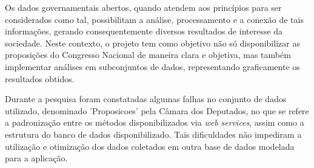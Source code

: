 \documentclass[
	12pt,				%
	openright,			%
	twoside,			%
	a4paper,			%
	english,			%
	french,				%
	spanish,			%
	brazil				%
	]{abntex2}
\begin{document}
Os dados governamentais abertos, quando atendem aos princípios para ser considerados como tal, possibilitam a análise, 
processamento e a conexão de tais informações, gerando consequentemente diversos resultados de interesse da sociedade. 
Neste contexto, o projeto tem como objetivo não só disponibilizar as proposições do Congresso Nacional de maneira clara e 
objetiva, mas também implementar análises em subconjuntos de dados, representando graficamente os resultados obtidos.

Durante a pesquisa foram constatadas algumas falhas no conjunto de dados utilizado, denominado 'Proposicoes' pela 
Câmara dos Deputados, no que se refere a padronização entre os métodos disponibilizados via \emph{web services}, assim
como a estrutura do banco de dados disponibilizado. Tais dificuldades não impediram a utilização e otimização dos dados
coletados em outra base de dados modelada para a aplicação.





%
%





\end{document}
